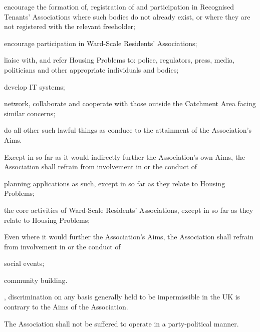 \documentclass[10pt]{mk-articles-of-association}
\newcommand{\WSRA}[0]{Ward-Scale Residents' Association}
\newcommand{\RTA}[0]{Recognised Tenants' Association}
\begin{document}
\begin{constenum}
\begin{constenum}
  \item encourage the formation of, registration of and participation
    in \RTA{}s where such bodies do not already exist, or where they
    are not registered with the relevant freeholder;

  \item encourage participation in \WSRA{}s;

  \item liaise with, and refer Housing Problems to: police, regulators,
    press, media, politicians and other appropriate individuals and bodies;

  \item develop IT systems;

  \item network, collaborate and cooperate with those outside the
    Catchment Area facing similar concerns;

  \item do all other such lawful things as conduce to the attainment
    of the Association's Aims.
\end{constenum}

\item Except in so far as it would indirectly further the Association's own
  Aims, the Association shall refrain from involvement in or the conduct of
  \begin{constenum}
  \item planning applications as such, except in so far as they relate
    to Housing Problems;
  \item the core activities of \WSRA{}s, except in so far as they
    relate to Housing Problems;
  \end{constenum}

\item Even where it would further the Association's Aims, the Association
  shall refrain from involvement in or the conduct of
  \begin{constenum}
  \item social events; \ITand
  \item community building.
  \end{constenum}

\item \avoiddoubt, discrimination on any basis generally held to be
  impermissible in the UK is contrary to the Aims of the
  Association.

\item The Association shall not be suffered to operate in
  a party-political manner.

\end{constenum}
\end{document}
